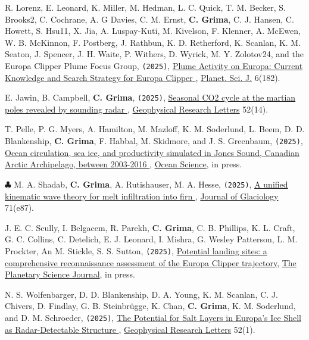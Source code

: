 \begin{etaremune}

\item
  R. Lorenz, E. Leonard, K. Miller, M. Hedman, L. C. Quick, T. M. Becker, S. Brooks2, C. Cochrane, A. G Davies, C. M. Ernst, \textbf{C. Grima}, C. J. Hansen, C. Howett, S. Hsu11, X. Jia, A. Luspay-Kuti, M. Kivelson, F. Klenner, A. McEwen, W. B. McKinnon, F. Postberg, J. Rathbun, K. D. Retherford, K. Scanlan, K. M. Seaton, J. Spencer, J. H. Waite, P. Withers, D. Wyrick, M. Y. Zolotov24, and the Europa Clipper Plume Focus Group, \texttt{(2025)}, \href{https://doi.org/10.3847/PSJ/adea6a}{Plume Activity on Europa: Current Knowledge and Search Strategy for Europa Clipper \aiOpenAccessSquare}, \ul{Planet. Sci. J.} 6(182).

\item
  E. Jawin, B. Campbell, \textbf{C. Grima}, \texttt{(2025)}, \href{https://doi.org/10.1029/2025GL116047}{Seasonal CO2 cycle at the martian poles revealed by sounding radar \aiOpenAccessSquare}, \ul{Geophysical Research Letters} 52(14).

\item
  T. Pelle, P. G. Myers, A. Hamilton, M. Mazloff, K. M. Soderlund, L. Beem, D. D. Blankenship, \textbf{C. Grima}, F. Habbal, M. Skidmore, and J. S. Greenbaum, \texttt{(2025)}, \href{https://doi.org/10.5194/egusphere-2024-3751}{Ocean circulation, sea ice, and productivity simulated in Jones Sound, Canadian Arctic Archipelago, between 2003-2016 \aiOpenAccessSquare}, \ul{Ocean Science}, in press.

\item
  $\clubsuit$ M. A. Shadab, \textbf{C. Grima}, A. Rutishauser, M. A. Hesse, \texttt{(2025)}, \href{https://doi.org/10.1017/jog.2025.10055}{A unified kinematic wave theory for melt infiltration into firn \aiOpenAccessSquare}, \ul{Journal of Glaciology} 71(e87). 

\item
  J. E. C. Scully, I. Belgacem, R. Parekh, \textbf{C. Grima}, C. B. Phillips, K. L. Craft, G. C. Collins, C. Detelich, E. J. Leonard, I. Mishra, G. Wesley Patterson, L. M. Prockter, An M. Stickle, S. S. Sutton, \texttt{(2025)}, \href{}{Potential landing sites: a comprehensive reconnaissance assessment of the Europa Clipper trajectory}, \ul{The Planetary Science Journal}, in press.

\item
  N. S. Wolfenbarger, D. D. Blankenship, D. A. Young, K. M. Scanlan, C. J. Chivers, D. Findlay, G. B. Steinbrügge, K. Chan, \textbf{C. Grima}, K. M. Soderlund, and D. M. Schroeder, \texttt{(2025)}, \href{https://agupubs.onlinelibrary.wiley.com/doi/full/10.1029/2024GL109144}{The Potential for Salt Layers in Europa’s Ice Shell as Radar-Detectable Structure \aiOpenAccessSquare}, \ul{Geophysical Research Letters} 52(1).


\end{etaremune}
